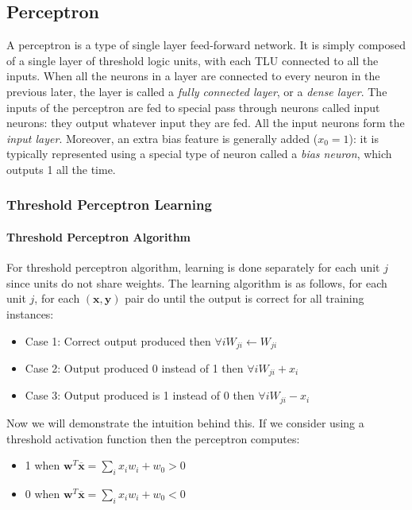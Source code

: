 \documentclass[12pt]{article}
\begin{document}
    \subsection{Perceptron}
        A perceptron is a type of single layer feed-forward network. It is simply composed of a single layer of threshold logic units, with each TLU connected to all the
        inputs. When all the neurons in a layer are connected to every neuron in the previous later, the layer is called
        a \textit{fully connected layer}, or a \textit{dense layer}. The inputs of the perceptron are fed to special
        pass through neurons called input neurons: they output whatever input they are fed. All the input neurons form
        the \textit{input layer}. Moreover, an extra bias feature is generally added ($x_0 = 1$): it is typically
        represented using a special type of neuron called a \textit{bias neuron}, which outputs 1 all the time.
        
        \subsubsection{Threshold Perceptron Learning}
            \paragraph{Threshold Perceptron Algorithm}
                For threshold perceptron algorithm, learning is done separately for each unit $j$ since units do not share
                weights. The learning algorithm is as follows, for each unit $j$, for each $(\boldsymbol{x},
                \boldsymbol{y})$ pair do until the output is correct for all training instances:
                \begin{itemize}
                    \item Case 1: Correct output produced then $\forall i W_{ji} \leftarrow W_{ji}$
                    \item Case 2: Output produced 0 instead of 1 then $\forall i W_{ji} + x_i$
                    \item Case 3: Output produced is 1 instead of 0 then $\forall i W_{ji} - x_i$ 
                \end{itemize}

                Now we will demonstrate the intuition behind this. If we consider using a threshold activation function then
                the perceptron computes:
                \begin{itemize}
                    \item 1 when $\boldsymbol{w}^T\overline{\boldsymbol{x}} = \sum_i x_iw_i + w_0 > 0$
                    \item 0 when $\boldsymbol{w}^T\overline{\boldsymbol{x}} = \sum_i x_iw_i + w_0 < 0$
                \end{itemize}
\end{document}
